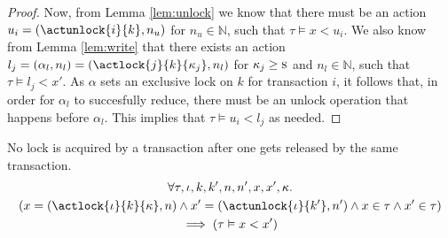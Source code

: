 \begin{lem}
\begin{proof}
	Now, from Lemma \ref{lem:unlock} we know that there must be an action $u_i = (\actunlock{i}{k}, n_u)$ for $n_u \in \mathds{N}$, such that $\tau \vDash x < u_i$.
	We also know from Lemma \ref{lem:write} that there exists an action $l_j = (\alpha_l, n_l) = (\actlock{j}{k}{\kappa_j}, n_l)$ for $\kappa_j \geq \textsc{s}$ and $n_l \in \mathds{N}$, such that $\tau \vDash l_j < x'$. As $\alpha$ sets an exclusive lock on $k$ for transaction $i$, it follows that, in order for $\alpha_l$ to succesfully reduce, there must be an unlock operation that happens before $\alpha_l$. This implies that $\tau \vDash u_i < l_j$ as needed.
	\end{proof}
\end{lem}

\lem \label{lem:2phase} No lock is acquired by a transaction after one gets released by the same transaction.
\begin{gather*}
	\forall \tau, \iota, k, k', n, n', x, x', \kappa \ldotp \\
	\left( x = (\actlock{\iota}{k}{\kappa}, n) \land x' = (\actunlock{\iota}{k'}, n') \land x \in \tau \land x' 	\in \tau \right) \\
	\implies \left( \tau \vDash x < x' \right)
\end{gather*}

